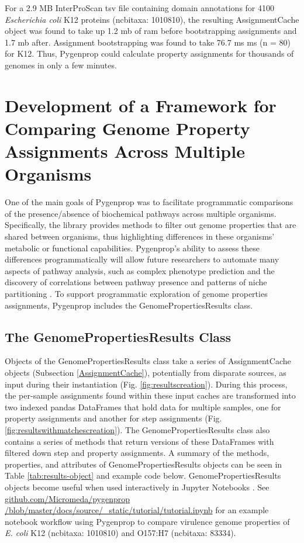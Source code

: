 For a 2.9 MB InterProScan \gls{tsv} file containing domain annotations for 4100 
\textit{Escherichia coli} K12 proteins (\gls{ncbitaxa}: 1010810), the resulting 
AssignmentCache object was found to take up 1.2 \gls{mb} of \gls{ram} before 
bootstrapping assignments and 1.7 \gls{mb} after. Assignment bootstrapping was 
found to take 76.7 ms  ms (\gls{n} = 80) for K12. Thus, Pygenprop 
could calculate property assignments for thousands of genomes in only a few 
minutes. %

\section{Development of a Framework for Comparing Genome Property Assignments 
Across Multiple Organisms} \label{GenomePropertiesResults}

One of the main goals of Pygenprop was to facilitate programmatic comparisons of 
the presence/absence of biochemical pathways across multiple organisms. 
Specifically, the library provides methods to filter out genome properties that are 
shared between organisms, thus highlighting differences in these organisms' 
metabolic or functional capabilities. Pygenprop's ability to assess these 
differences programmatically will allow future researchers to automate many 
aspects of pathway analysis, such as complex phenotype prediction and the 
discovery of correlations between pathway presence and patterns of niche 
partitioning \cite{finke2008niche}. To support programmatic exploration of 
genome properties assignments, Pygenprop includes the GenomePropertiesResults 
class. 

\subsection{The GenomePropertiesResults Class}

Objects of the GenomePropertiesResults class take a series of AssignmentCache 
objects (Subsection \ref{AssignmentCache}), potentially from disparate sources, 
as input during their instantiation (Fig. \ref{fig:resultscreation}). During 
this process, the per-sample assignments found within these input caches are 
transformed into two indexed pandas DataFrames \cite{mckinney2010data} that hold 
data for multiple samples, one for property assignments and another for step 
assignments (Fig. \ref{fig:resultswithmatchescreation}). The 
GenomePropertiesResults class also contains a series of methods that return 
versions of these DataFrames with filtered down step and property assignments. A 
summary of the methods, properties, and attributes of GenomePropertiesResults 
objects can be seen in Table \ref{tab:results-object} and example code below. 
GenomePropertiesResults objects become useful when used interactively in Jupyter 
Notebooks \cite{kluyver2016jupyter}. See 
\href{http://github.com/Micromeda/pygenprop/blob/master/docs/source/_static/tutorial/tutorial.ipynb}{github.com/Micromeda/pygenprop 
/blob/master/docs/source/\_static/tutorial/tutorial.ipynb} for an example 
notebook workflow using Pygenprop to compare virulence genome properties of 
\textit{E. coli} K12 (\gls{ncbitaxa}: 1010810) and O157:H7 (\gls{ncbitaxa}: 
83334).


